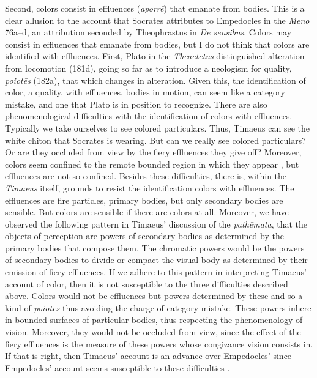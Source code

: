 Second, colors consist in effluences (\emph{aporrē}) that emanate from bodies. This is a clear allusion to the account that Socrates attributes to Empedocles in the \emph{Meno} 76a--d, an attribution seconded by Theophrastus in \emph{De sensibus}. Colors may consist in effluences that emanate from bodies, but I do not think that colors are identified with effluences. First, Plato in the \emph{Theaetetus} distinguished alteration from locomotion (181d), going so far as to introduce a neologism for quality, \emph{poiotēs} (182a), that which changes in alteration. Given this, the identification of color, a quality, with effluences, bodies in motion, can seem like a category mistake, and one that Plato is in position to recognize. There are also phenomenological difficulties with the identification of colors with effluences. Typically we take ourselves to see colored particulars. Thus, Timaeus can see the white chiton that Socrates is wearing. But can we really see colored particulars? Or are they occluded from view by the fiery effluences they give off? Moreover, colors seem confined to the remote bounded region in which they appear \citep{Broad:1952kx}, but effluences are not so confined. Besides these difficulties, there is, within the \emph{Timaeus} itself, grounds to resist the identification colors with effluences. The effluences are fire particles, primary bodies, but only secondary bodies are sensible. But colors are sensible if there are colors at all. Moreover, we have observed the following pattern in Timaeus' discussion of the \emph{pathēmata}, that the objects of perception are powers of secondary bodies as determined by the primary bodies that compose them. The chromatic powers would be the powers of secondary bodies to divide or compact the visual body as determined by their emission of fiery effluences. If we adhere to this pattern in interpreting Timaeus' account of color, then it is not susceptible to the three difficulties described above. Colors would not be effluences but powers determined by these and so a kind of \emph{poiotēs} thus avoiding the charge of category mistake. These powers inhere in bounded surfaces of particular bodies, thus respecting the phenomenology of vision. Moreover, they would not be occluded from view, since the effect of the fiery effluences is the measure of these powers whose congizance vision consists in. If that is right, then Timaeus' account is an advance over Empedocles' since Empedocles' account seems susceptible to these difficulties \citep[6]{Kalderon:2015fr}.

